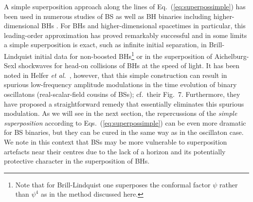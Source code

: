 \documentclass[]{iopart}
\begin{document}
A simple superposition approach along the lines of
Eq.~(\ref{eq:superpossimple}) has been used in numerous studies of
BS as well as BH binaries including higher-dimensional BHs
\cite{Palenzuela:2006wp,Palenzuela:2007dm,Shibata:2008rq,Okawa:2011fv,Palenzuela:2017kcg,Sperhake:2019oaw}.
For BHs and higher-dimensional spacetimes in particular, this
leading-order approximation has proved remarkably successful and
in some limits a simple superposition is exact, such as infinite
initial separation, in Brill-Lindquist initial data for non-boosted
\setcounter{footnote}{6} BHs\footnote{Note that for Brill-Lindquist
one superposes the conformal factor $\psi$ rather than $\psi^4$ as
in the method discussed here.} \cite{Brill:1963yv} or in the
superposition of Aichelburg-Sexl shockwaves \cite{Aichelburg:1970dh}
for head-on collisions of BHs at the speed of light.  It has been
noted in Helfer {\em et al.}~\cite{Helfer:2018vtq}, however, that
this simple construction can result in spurious low-frequency
amplitude modulations in the time evolution of binary oscillatons
(real-scalar-field cousins of BSs); cf.~their Fig.~7.  Furthermore,
they have proposed a straightforward remedy that essentially
eliminates this spurious modulation. As we will see in the next
section, the repercussions of the {\it simple superposition} according
to Eqs.~(\ref{eq:superpossimple}) can be even more dramatic for BS
binaries, but they can be cured in the same way as in the oscillaton
case.  We note in this context that BSs may be more vulnerable to
superposition artefacts near their centres due to the lack of a
horizon and its potentially protective character in the superposition
of BHs.
\end{document}
